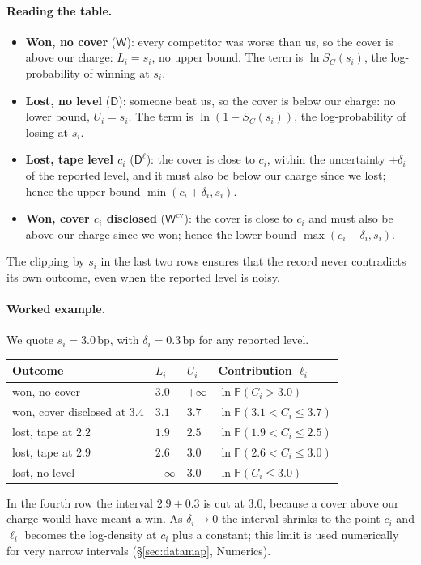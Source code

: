 \documentclass[11pt,a4paper]{article}
\theoremstyle{definition}
\theoremstyle{remark}
\newcommand{\Prob}{\mathbb{P}}
\newcommand{\Win}{\mathsf{W}}
\newcommand{\Wc}{\mathsf{W}^{\mathrm{cv}}}
\newcommand{\Dl}{\mathsf{D}^{\ell}}
\newcommand{\Dn}{\mathsf{D}}
\begin{document}
\paragraph{Reading the table.}
\begin{itemize}[itemsep=2pt]
\item \textbf{Won, no cover} ($\Win$): every competitor was worse than us, so the cover is above our charge: $L_i=s_i$, no upper bound. The term is $\ln S_C(s_i)$, the log-probability of winning at $s_i$.
\item \textbf{Lost, no level} ($\Dn$): someone beat us, so the cover is below our charge: no lower bound, $U_i=s_i$. The term is $\ln(1-S_C(s_i))$, the log-probability of losing at $s_i$.
\item \textbf{Lost, tape level $c_i$} ($\Dl$): the cover is close to $c_i$, within the uncertainty $\pm\delta_i$ of the reported level, and it must also be below our charge since we lost; hence the upper bound $\min(c_i+\delta_i,s_i)$.
\item \textbf{Won, cover $c_i$ disclosed} ($\Wc$): the cover is close to $c_i$ and must also be above our charge since we won; hence the lower bound $\max(c_i-\delta_i,s_i)$.
\end{itemize}
The clipping by $s_i$ in the last two rows ensures that the record never contradicts its own outcome, even when the reported level is noisy.

\paragraph{Worked example.} We quote $s_i=3.0$\,bp, with $\delta_i=0.3$\,bp for any reported level.
\begin{center}
\small
\begin{tabular}{llll}
\toprule
Outcome & $L_i$ & $U_i$ & Contribution $\ell_i$ \\
\midrule
won, no cover & $3.0$ & $+\infty$ & $\ln\Prob(C_i>3.0)$ \\
won, cover disclosed at $3.4$ & $3.1$ & $3.7$ & $\ln\Prob(3.1<C_i\le3.7)$ \\
lost, tape at $2.2$ & $1.9$ & $2.5$ & $\ln\Prob(1.9<C_i\le2.5)$ \\
lost, tape at $2.9$ & $2.6$ & $3.0$ & $\ln\Prob(2.6<C_i\le3.0)$ \\
lost, no level & $-\infty$ & $3.0$ & $\ln\Prob(C_i\le3.0)$ \\
\bottomrule
\end{tabular}
\end{center}
In the fourth row the interval $2.9\pm0.3$ is cut at $3.0$, because a cover above our charge would have meant a win. As $\delta_i\to0$ the interval shrinks to the point $c_i$ and $\ell_i$ becomes the log-density at $c_i$ plus a constant; this limit is used numerically for very narrow intervals (\S\ref{sec:datamap}, Numerics).
\end{document}
